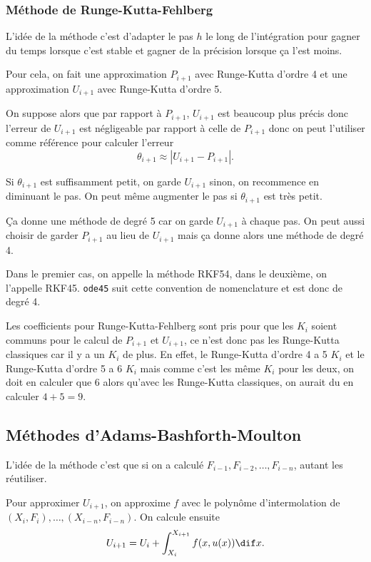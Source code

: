 \subsubsection{Méthode de Runge-Kutta-Fehlberg}
L'idée de la méthode c'est d'adapter le pas $h$ le long de l'intégration
pour gagner du temps lorsque c'est stable et gagner de la précision
lorsque ça l'est moins.

Pour cela, on fait une approximation $P_{i+1}$ avec Runge-Kutta d'ordre 4
et une approximation $U_{i+1}$ avec Runge-Kutta d'ordre 5.

On suppose alors que par rapport à $P_{i+1}$, $U_{i+1}$ est beaucoup plus
précis donc l'erreur de $U_{i+1}$ est négligeable par rapport à celle
de $P_{i+1}$ donc on peut l'utiliser comme référence pour calculer
l'erreur
\[ \theta_{i+1} \approx |U_{i+1} - P_{i+1}|. \]

Si $\theta_{i+1}$ est suffisamment petit, on garde $U_{i+1}$ sinon,
on recommence en diminuant le pas.
On peut même augmenter le pas si $\theta_{i+1}$ est très petit.

Ça donne une méthode de degré 5 car on garde $U_{i+1}$ à chaque pas.
On peut aussi choisir de garder $P_{i+1}$ au lieu de $U_{i+1}$ mais ça donne
alors une méthode de degré 4.

Dans le premier cas, on appelle la méthode RKF54,
dans le deuxième, on l'appelle RKF45.
\lstinline|ode45| suit cette convention de nomenclature et est
donc de degré 4.

\begin{myrem}
  Les coefficients pour Runge-Kutta-Fehlberg sont pris pour que
  les $K_i$ soient communs pour le calcul de $P_{i+1}$ et $U_{i+1}$,
  ce n'est donc pas les Runge-Kutta classiques car il y a un $K_i$ de plus.
  En effet, le Runge-Kutta d'ordre 4 a 5 $K_i$ et le Runge-Kutta d'ordre
  5 a 6 $K_i$ mais comme c'est les même $K_i$ pour les deux, on doit
  en calculer que 6 alors qu'avec les Runge-Kutta classiques,
  on aurait du en calculer $4 + 5 = 9$.
\end{myrem}

\subsection{Méthodes d'Adams-Bashforth-Moulton}
L'idée de la méthode c'est que si on a calculé
$F_{i-1}, F_{i-2}, \ldots, F_{i-n}$,
autant les réutiliser.

Pour approximer $U_{i+1}$,
on approxime $f$ avec le polynôme d'intermolation de
$(X_i, F_i), \ldots, (X_{i-n},F_{i-n})$.
On calcule ensuite
\[ U_{i+1} = U_i + \int_{X_i}^{X_{i+1}}f(x,u(x))\dif x. \]


